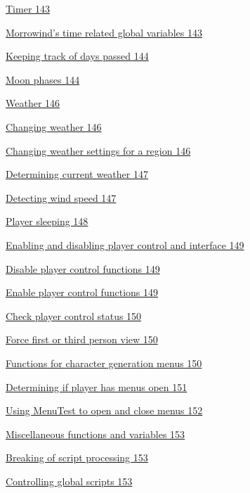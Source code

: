 \documentclass[
]{article}
\begin{document}
\protect\hyperlink{timer}{Timer 143}

\protect\hyperlink{morrowinds-time-related-global-variables}{Morrowind's
time related global variables 143}

\protect\hyperlink{keeping-track-of-days-passed}{Keeping track of days
passed 144}

\protect\hyperlink{moon-phases}{Moon phases 144}

\protect\hyperlink{weather}{Weather 146}

\protect\hyperlink{changing-weather}{Changing weather 146}

\protect\hyperlink{changing-weather-settings-for-a-region}{Changing
weather settings for a region 146}

\protect\hyperlink{determining-current-weather}{Determining current
weather 147}

\protect\hyperlink{detecting-wind-speed}{Detecting wind speed 147}

\protect\hyperlink{player-sleeping}{Player sleeping 148}

\protect\hyperlink{enabling-and-disabling-player-control-and-interface}{Enabling
and disabling player control and interface 149}

\protect\hyperlink{disable-player-control-functions}{Disable player
control functions 149}

\protect\hyperlink{enable-player-control-functions}{Enable player
control functions 149}

\protect\hyperlink{check-player-control-status}{Check player control
status 150}

\protect\hyperlink{force-first-or-third-person-view}{Force first or
third person view 150}

\protect\hyperlink{functions-for-character-generation-menus}{Functions
for character generation menus 150}

\protect\hyperlink{determining-if-player-has-menus-open}{Determining if
player has menus open 151}

\protect\hyperlink{using-menutest-to-open-and-close-menus}{Using
MenuTest to open and close menus 152}

\protect\hyperlink{miscellaneous-functions-and-variables}{Miscellaneous
functions and variables 153}

\protect\hyperlink{breaking-of-script-processing}{Breaking of script
processing 153}

\protect\hyperlink{controlling-global-scripts}{Controlling global
scripts 153}
\end{document}
